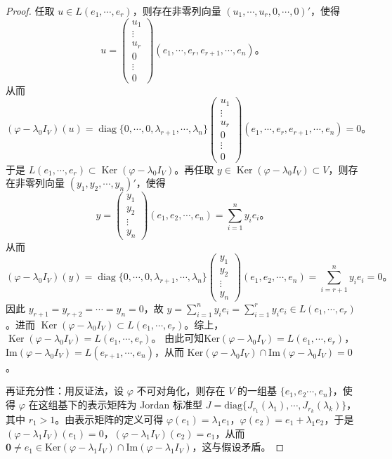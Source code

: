 \documentclass[../../main.tex]{subfiles}
\begin{document}
\begin{proof}
任取 \(u \in L(e_1, \cdots, e_r)\)，则存在非零列向量 \((u_1, \cdots, u_r, 0, \cdots, 0)'\)，使得
\[
u = \begin{pmatrix}
u_1 \\
\vdots \\
u_r \\
0 \\
\vdots \\
0
\end{pmatrix}
(e_1, \cdots, e_r, e_{r+1}, \cdots, e_n)。
\]
从而
\[
(\varphi - \lambda_0 I_V)(u) = \operatorname{diag}\{0, \cdots, 0, \lambda_{r+1}, \cdots, \lambda_n\}
\begin{pmatrix}
u_1 \\
\vdots \\
u_r \\
0 \\
\vdots \\
0
\end{pmatrix}
(e_1, \cdots, e_r, e_{r+1}, \cdots, e_n) = 0。
\]
于是 \(L(e_1, \cdots, e_r) \subset \operatorname{Ker}(\varphi - \lambda_0 I_V)\)。再任取 \(y \in \operatorname{Ker}(\varphi - \lambda_0 I_V) \subset V\)，则存在非零列向量 \((y_1, y_2, \cdots, y_n)'\)，使得
\[
y = \begin{pmatrix}
y_1 \\
y_2 \\
\vdots \\
y_n
\end{pmatrix}
(e_1, e_2, \cdots, e_n) = \sum_{i=1}^n y_i e_i。
\]
从而
\[
(\varphi - \lambda_0 I_V)(y) = \operatorname{diag}\{0, \cdots, 0, \lambda_{r+1}, \cdots, \lambda_n\}
\begin{pmatrix}
y_1 \\
y_2 \\
\vdots \\
y_n
\end{pmatrix}
(e_1, e_2, \cdots, e_n)
= \sum_{i=r+1}^n y_i e_i = 0。
\]
因此 \(y_{r+1} = y_{r+2} = \cdots = y_n = 0\)，故 \(y = \sum_{i=1}^n y_i e_i = \sum_{i=1}^r y_i e_i \in L(e_1, \cdots, e_r)\)。进而 \(\operatorname{Ker}(\varphi - \lambda_0 I_V) \subset L(e_1, \cdots, e_r)\)。综上，\(\operatorname{Ker}(\varphi - \lambda_0 I_V) = L(e_1, \cdots, e_r)\)。
由此可知$\mathrm{Ker}(\varphi - \lambda_0I_V)=L(e_1,\cdots,e_r)$，$\mathrm{Im}(\varphi - \lambda_0I_V)=L(e_{r + 1},\cdots,e_n)$，从而 $\mathrm{Ker}(\varphi - \lambda_0I_V)\cap\mathrm{Im}(\varphi - \lambda_0I_V)=0$。

{\heiti 再证充分性：}用反证法，设 $\varphi$ 不可对角化，则存在 $V$ 的一组基 $\{e_1,e_2\cdots,e_n\}$，使得 $\varphi$ 在这组基下的表示矩阵为 Jordan 标准型 $J = \mathrm{diag}\{J_{r_1}(\lambda_1),\cdots,J_{r_k}(\lambda_k)\}$，其中 $r_1 > 1$。由表示矩阵的定义可得 $\varphi(e_1)=\lambda_1e_1$，$\varphi(e_2)=e_1 + \lambda_1e_2$，于是 $(\varphi - \lambda_1I_V)(e_1)=0$，$(\varphi - \lambda_1I_V)(e_2)=e_1$，从而 $\mathbf{0}\neq e_1\in\mathrm{Ker}(\varphi - \lambda_1I_V)\cap\mathrm{Im}(\varphi - \lambda_1I_V)$，这与假设矛盾。
\end{proof}
\end{document}
